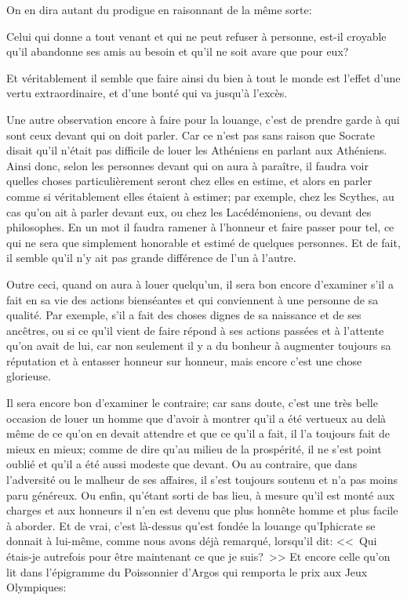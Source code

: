 On en dira autant du prodigue en raisonnant de la même sorte:

\begin{emphpar}
	Celui qui donne a tout venant et qui ne peut refuser à personne, est-il croyable qu'il abandonne ses amis au
	besoin et qu'il ne soit avare que pour eux?
\end{emphpar}

Et véritablement il semble que faire ainsi du bien à tout le monde est l'effet d'une vertu extraordinaire, et
d'une bonté qui va jusqu'à l'excès.

\bigbreak

Une autre observation encore à faire pour la louange, c'est de prendre garde à qui sont ceux devant qui on doit parler.
Car ce n'est pas sans raison que Socrate disait qu'il n'était pas difficile de louer les Athéniens en parlant aux Athéniens.
Ainsi donc, selon les personnes devant qui on aura à paraître, il faudra voir quelles choses particulièrement seront chez
elles en estime, et alors en parler comme si véritablement elles étaient à estimer; par exemple, chez les Scythes, au cas
qu'on ait à parler devant eux, ou chez les Lacédémoniens, ou devant des philosophes. En un mot il faudra ramener à l'honneur
et faire passer pour tel, ce qui ne sera que simplement honorable et estimé de quelques personnes. Et de fait, il semble
qu'il n'y ait pas grande différence de l'un à l'autre.

\bigbreak

Outre ceci, quand on aura à louer quelqu'un, il sera bon encore d'examiner s'il a fait en sa vie des actions bienséantes et
qui conviennent à une personne de sa qualité. Par exemple, s'il a fait des choses dignes de sa naissance et de ses ancêtres,
ou si ce qu'il vient de faire répond à ses actions passées et à l'attente qu'on avait de lui, car non seulement il y a du
bonheur à augmenter toujours sa réputation et à entasser honneur sur honneur, mais encore c'est une chose glorieuse.

\bigbreak

Il sera encore bon d'examiner le contraire; car sans doute, c'est une très belle occasion de louer un homme que d'avoir
à montrer qu'il a été vertueux au delà même de ce qu'on en devait attendre et que ce qu'il a fait, il l'a toujours fait
de mieux en mieux; comme de dire qu'au milieu de la prospérité, il ne s'est point oublié et qu'il a été aussi modeste
que devant. Ou au contraire, que dans l'adversité ou le malheur de ses affaires, il s'est toujours soutenu et n'a pas moins
paru généreux. Ou enfin, qu'étant sorti de bas lieu, à mesure qu'il est monté aux charges et aux honneurs il n'en est devenu
que plus honnête homme et plus facile à aborder. Et de vrai, c'est là-dessus qu'est fondée la louange qu'Iphicrate se donnait
à lui-même, comme nous avons déjà remarqué, lorsqu'il dit: <<~Qui étais-je autrefois pour être maintenant ce que je suis?~>>
Et encore celle qu'on lit dans l'épigramme du Poissonnier d'Argos qui remporta le prix aux Jeux Olympiques:


